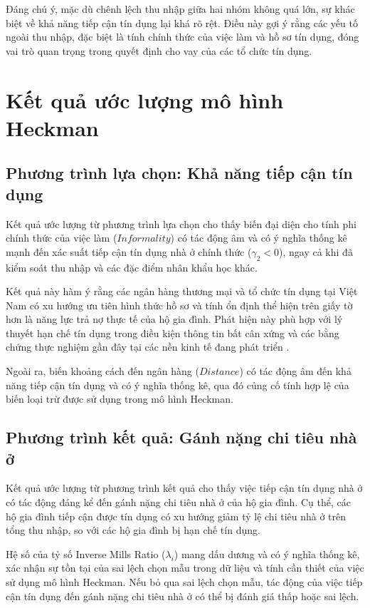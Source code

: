 \documentclass[12pt,a4paper]{report}
\begin{document}
Đáng chú ý, mặc dù chênh lệch thu nhập giữa hai nhóm không quá lớn, sự khác biệt về khả năng tiếp cận tín dụng lại khá rõ rệt. Điều này gợi ý rằng các yếu tố ngoài thu nhập, đặc biệt là tính chính thức của việc làm và hồ sơ tín dụng, đóng vai trò quan trọng trong quyết định cho vay của các tổ chức tín dụng.

\section{Kết quả ước lượng mô hình Heckman}

\subsection{Phương trình lựa chọn: Khả năng tiếp cận tín dụng}

Kết quả ước lượng từ phương trình lựa chọn cho thấy biến đại diện cho tính phi chính thức của việc làm ($Informality$) có tác động âm và có ý nghĩa thống kê mạnh đến xác suất tiếp cận tín dụng nhà ở chính thức ($\gamma_2 < 0$), ngay cả khi đã kiểm soát thu nhập và các đặc điểm nhân khẩu học khác.

Kết quả này hàm ý rằng các ngân hàng thương mại và tổ chức tín dụng tại Việt Nam có xu hướng ưu tiên hình thức hồ sơ và tính ổn định thể hiện trên giấy tờ hơn là năng lực trả nợ thực tế của hộ gia đình. Phát hiện này phù hợp với lý thuyết hạn chế tín dụng trong điều kiện thông tin bất cân xứng và các bằng chứng thực nghiệm gần đây tại các nền kinh tế đang phát triển \parencite{WB2023}.

Ngoài ra, biến khoảng cách đến ngân hàng ($Distance$) có tác động âm đến khả năng tiếp cận tín dụng và có ý nghĩa thống kê, qua đó củng cố tính hợp lệ của biến loại trừ được sử dụng trong mô hình Heckman.

\subsection{Phương trình kết quả: Gánh nặng chi tiêu nhà ở}

Kết quả ước lượng từ phương trình kết quả cho thấy việc tiếp cận tín dụng nhà ở có tác động đáng kể đến gánh nặng chi tiêu nhà ở của hộ gia đình. Cụ thể, các hộ gia đình tiếp cận được tín dụng có xu hướng giảm tỷ lệ chi tiêu nhà ở trên tổng thu nhập, so với các hộ gia đình bị hạn chế tín dụng.

Hệ số của tỷ số Inverse Mills Ratio ($\lambda_i$) mang dấu dương và có ý nghĩa thống kê, xác nhận sự tồn tại của sai lệch chọn mẫu trong dữ liệu và tính cần thiết của việc sử dụng mô hình Heckman. Nếu bỏ qua sai lệch chọn mẫu, tác động của việc tiếp cận tín dụng đến gánh nặng chi tiêu nhà ở có thể bị đánh giá thấp hoặc sai lệch.
\end{document}

